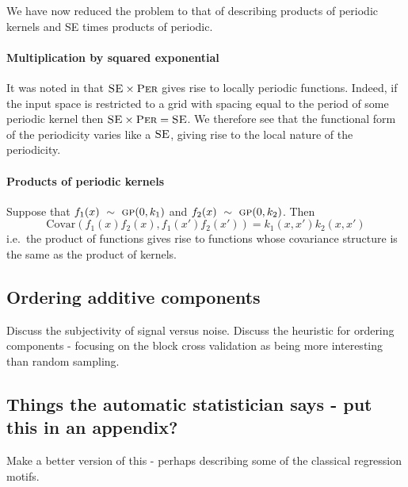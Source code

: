 \documentclass{article}
\def\ie{i.e.\ }
\begin{document}
We have now reduced the problem to that of describing products of periodic kernels and SE times products of periodic.

\paragraph{Multiplication by squared exponential}

It was noted in \cite{DuvLloGroetal13} that ${\textsc{SE}} \times {\textsc{Per}}$ gives rise to locally periodic functions.
Indeed, if the input space is restricted to a grid with spacing equal to the period of some periodic kernel then ${\textsc{SE}} \times {\textsc{Per}} = {\textsc{SE}}$.
We therefore see that the functional form of the periodicity varies like a ${\textsc{SE}}$, giving rise to the local nature of the periodicity.

\paragraph{Products of periodic kernels}

Suppose that ${f_1(x) \ \sim\  {\textsc{gp}}{}(0, k_1)}$ and ${f_2(x) \ \sim\  {\textsc{gp}}{}(0, k_2)}$.
Then
\begin{equation}
{\textrm{Covar}(f_1(x)f_2(x), f_1(x')f_2(x')) = k_1(x,x')k_2(x,x')}
\end{equation}
\ie the product of functions gives rise to functions whose covariance structure is the same as the product of kernels.


\subsection{Ordering additive components}

Discuss the subjectivity of signal versus noise.
Discuss the heuristic for ordering components - focusing on the block cross validation as being more interesting than random sampling.

\subsection{Things the automatic statistician says - put this in an appendix?}
\label{sec:example_translation}

Make a better version of this - perhaps describing some of the classical regression motifs.
\end{document}

